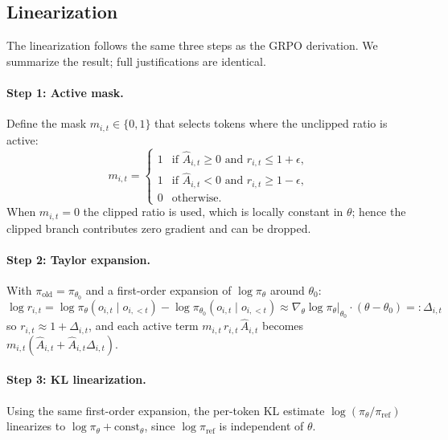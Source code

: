 \documentclass{article}
\begin{document}
\subsection{Linearization}

The linearization follows the same three steps as the GRPO derivation. We summarize the result; full justifications are identical.

\paragraph{Step 1: Active mask.}
Define the mask $m_{i,t}\in\{0,1\}$ that selects tokens where the unclipped ratio is active:
\begin{equation}
    m_{i,t} = \begin{cases}
        1 & \text{if } \hat{A}_{i,t}\ge 0 \text{ and } r_{i,t}\le 1+\epsilon,\\
        1 & \text{if } \hat{A}_{i,t}< 0 \text{ and } r_{i,t}\ge 1-\epsilon,\\
        0 & \text{otherwise.}
    \end{cases}
\end{equation}
When $m_{i,t}=0$ the clipped ratio is used, which is locally constant in $\theta$; hence the clipped branch contributes zero gradient and can be dropped.

\paragraph{Step 2: Taylor expansion.}
With $\pi_{\mathrm{old}}=\pi_{\theta_0}$ and a first-order expansion of $\log\pi_\theta$ around $\theta_0$:
\begin{equation}
    \log r_{i,t}
    = \log\pi_\theta(o_{i,t}\mid o_{i,<t}) - \log\pi_{\theta_0}(o_{i,t}\mid o_{i,<t})
    \approx \nabla_\theta\log\pi_\theta\big|_{\theta_0}\!\cdot(\theta-\theta_0)
    =: \Delta_{i,t}
\end{equation}
so $r_{i,t}\approx 1+\Delta_{i,t}$, and each active term $m_{i,t}\,r_{i,t}\,\hat{A}_{i,t}$ becomes $m_{i,t}(\hat{A}_{i,t}+\hat{A}_{i,t}\Delta_{i,t})$.

\paragraph{Step 3: KL linearization.}
Using the same first-order expansion, the per-token KL estimate $\log(\pi_\theta/\pi_{\mathrm{ref}})$ linearizes to $\log\pi_\theta + \mathrm{const}_\theta$, since $\log\pi_{\mathrm{ref}}$ is independent of $\theta$.
\end{document}

